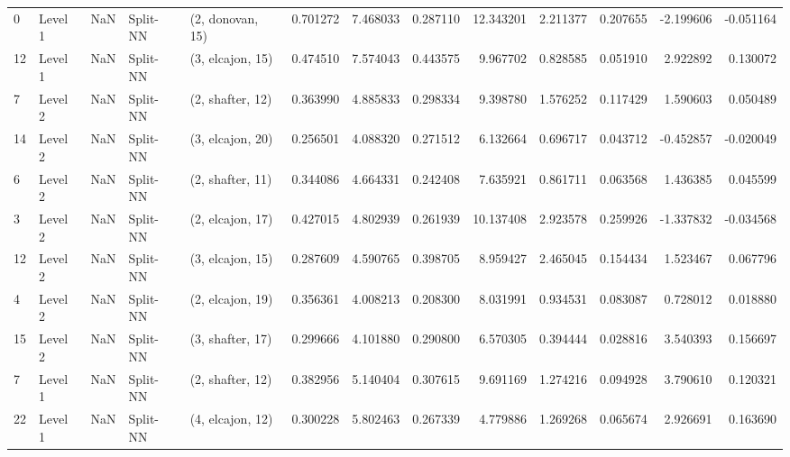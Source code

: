\begin{tabular}{llrllrrrrrrrr}
0  &   Level 1 &    NaN &       Split-NN &  (2, donovan, 15) &   0.701272 &   7.468033 &  0.287110 &  12.343201 &             2.211377 &               0.207655 &           -2.199606 &             -0.051164 \\
12 &   Level 1 &    NaN &       Split-NN &  (3, elcajon, 15) &   0.474510 &   7.574043 &  0.443575 &   9.967702 &             0.828585 &               0.051910 &            2.922892 &              0.130072 \\
7  &   Level 2 &    NaN &       Split-NN &  (2, shafter, 12) &   0.363990 &   4.885833 &  0.298334 &   9.398780 &             1.576252 &               0.117429 &            1.590603 &              0.050489 \\
14 &   Level 2 &    NaN &       Split-NN &  (3, elcajon, 20) &   0.256501 &   4.088320 &  0.271512 &   6.132664 &             0.696717 &               0.043712 &           -0.452857 &             -0.020049 \\
6  &   Level 2 &    NaN &       Split-NN &  (2, shafter, 11) &   0.344086 &   4.664331 &  0.242408 &   7.635921 &             0.861711 &               0.063568 &            1.436385 &              0.045599 \\
3  &   Level 2 &    NaN &       Split-NN &  (2, elcajon, 17) &   0.427015 &   4.802939 &  0.261939 &  10.137408 &             2.923578 &               0.259926 &           -1.337832 &             -0.034568 \\
12 &   Level 2 &    NaN &       Split-NN &  (3, elcajon, 15) &   0.287609 &   4.590765 &  0.398705 &   8.959427 &             2.465045 &               0.154434 &            1.523467 &              0.067796 \\
4  &   Level 2 &    NaN &       Split-NN &  (2, elcajon, 19) &   0.356361 &   4.008213 &  0.208300 &   8.031991 &             0.934531 &               0.083087 &            0.728012 &              0.018880 \\
15 &   Level 2 &    NaN &       Split-NN &  (3, shafter, 17) &   0.299666 &   4.101880 &  0.290800 &   6.570305 &             0.394444 &               0.028816 &            3.540393 &              0.156697 \\
7  &   Level 1 &    NaN &       Split-NN &  (2, shafter, 12) &   0.382956 &   5.140404 &  0.307615 &   9.691169 &             1.274216 &               0.094928 &            3.790610 &              0.120321 \\
22 &   Level 1 &    NaN &       Split-NN &  (4, elcajon, 12) &   0.300228 &   5.802463 &  0.267339 &   4.779886 &             1.269268 &               0.065674 &            2.926691 &              0.163690 \\

\end{tabular}
